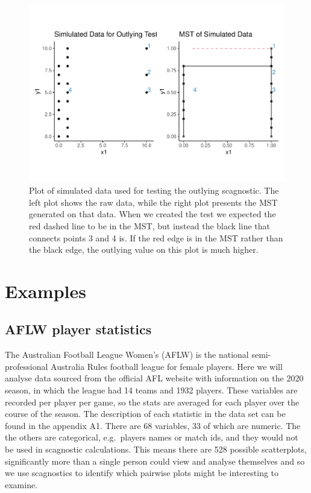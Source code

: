 \begin{Schunk}
\begin{figure}
\includegraphics[width=1\linewidth]{mason-lee-laa-cook_files/figure-latex/outlying-test-plot-1} \caption[Plot of simulated data used for testing the outlying scagnostic]{Plot of simulated data used for testing the outlying scagnostic. The left plot shows the raw data, while the right plot presents the MST generated on that data. When we created the test we expected the red dashed line to be in the MST, but instead the black line that connects points 3 and 4 is. If the red edge is in the MST rather than the black edge, the outlying value on this plot is much higher.}\label{fig:outlying-test-plot}
\end{figure}
\end{Schunk}

\hypertarget{examples}{%
\section{Examples}\label{examples}}

\hypertarget{aflw-player-statistics}{%
\subsection{AFLW player statistics}\label{aflw-player-statistics}}

The Australian Football League Women's (AFLW) is the national
semi-professional Australia Rules football league for female players.
Here we will analyse data sourced from the official AFL website with
information on the 2020 season, in which the league had 14 teams and
1932 players. These variables are recorded per player per game, so the
stats are averaged for each player over the course of the season. The
description of each statistic in the data set can be found in the
appendix A1. There are 68 variables, 33 of which are numeric. The the
others are categorical, e.g.~players names or match ids, and they would
not be used in scagnostic calculations. This means there are 528
possible scatterplots, significantly more than a single person could
view and analyse themselves and so we use scagnostics to identify which
pairwise plots might be interesting to examine.

